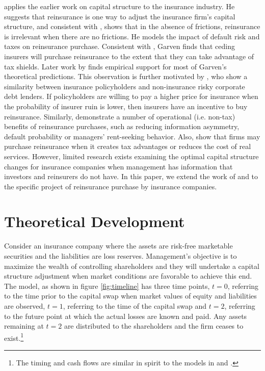 \citet{garven1987a} applies the earlier work on capital structure to the insurance industry.  He suggests that reinsurance is one way to adjust the insurance firm's capital structure, and consistent with \citet{modigliani1958a}, shows that in the absence of frictions, reinsurance is irrelevant when there are no frictions.  He models the impact of default risk and taxes on reinsurance purchase.  Consistent with \citet{modigliani1963a}, Garven finds that ceding insurers will purchase reinsurance to the extent that they can take advantage of tax shields.  Later work by \citet{garven2003a} finds empirical support for most of Garven's theoretical predictions. This observation is further motivated by \citet{doherty1981a}, who show a similarity between insurance policyholders and non-insurance risky corporate debt lenders. If policyholders are willing to pay a higher price for insurance when the probability of insurer ruin is lower, then insurers have an incentive to buy reinsurance.  Similarly, \citet{scordis2006a} demonstrate a number of operational (i.e. non-tax) benefits of reinsurance purchases, such as reducing information asymmetry, default probability or managers' rent-seeking behavior.  Also, \citet{mayers1990a} show that firms may purchase reinsurance when it creates tax advantages or reduces the cost of real services.  However, limited research exists examining the optimal capital structure changes for insurance companies when management has information that investors and reinsurers do not have.  In this paper, we extend the work of \citet{myers1984a} and \citet{rendleman1980a} to the specific project of reinsurance purchase by insurance companies.

\section{Theoretical Development}\label{sec:model}

Consider an insurance company where the assets are risk-free marketable securities and the liabilities are loss reserves. Management's objective is to maximize the wealth of controlling shareholders and they will undertake a capital structure adjustment when market conditions are favorable to achieve this end.  The model, as shown in figure \ref{fig:timeline} has three time points, $t=0$, referring to the time prior to the capital swap when market values of equity and liabilities are observed, $t=1$, referring to the time of the capital swap and $t=2$, referring to the future point at which the actual losses are known and paid. Any assets remaining at $t=2$ are distributed to the shareholders and the firm ceases to exist.\footnote{The timing and cash flows are similar in spirit to the models in \citet{palmon2007a} and \citet{brunner2006a}.}

